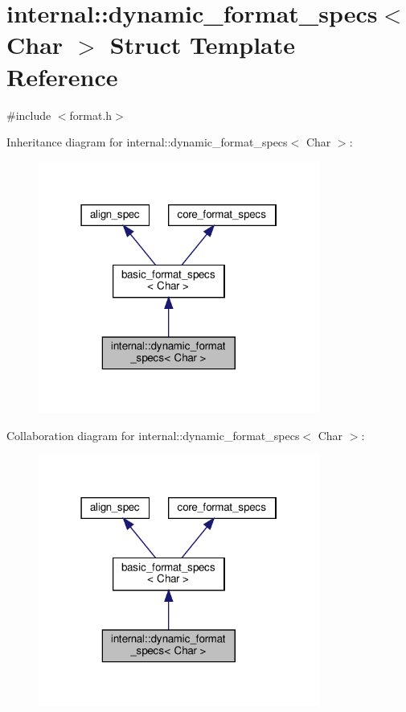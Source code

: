 \hypertarget{structinternal_1_1dynamic__format__specs}{}\section{internal\+:\+:dynamic\+\_\+format\+\_\+specs$<$ Char $>$ Struct Template Reference}
\label{structinternal_1_1dynamic__format__specs}


{\ttfamily \#include $<$format.\+h$>$}



Inheritance diagram for internal\+:\+:dynamic\+\_\+format\+\_\+specs$<$ Char $>$\+:
\nopagebreak
\begin{figure}[H]
\begin{center}
\leavevmode
\includegraphics[width=262pt]{structinternal_1_1dynamic__format__specs__inherit__graph}
\end{center}
\end{figure}


Collaboration diagram for internal\+:\+:dynamic\+\_\+format\+\_\+specs$<$ Char $>$\+:
\nopagebreak
\begin{figure}[H]
\begin{center}
\leavevmode
\includegraphics[width=262pt]{structinternal_1_1dynamic__format__specs__coll__graph}
\end{center}
\end{figure}
